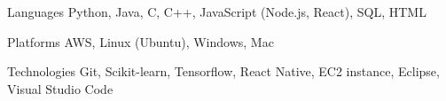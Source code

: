 \begin{cvskills}

\cvskill
    {Languages}
    {Python, Java, C, C++, JavaScript (Node.js, React), SQL, HTML}

\cvskill
    {Platforms}
    {AWS, Linux (Ubuntu), Windows, Mac}

\cvskill
    {Technologies}
    {Git, Scikit-learn, Tensorflow, React Native, EC2 instance, Eclipse, Visual Studio Code}

\end{cvskills}
